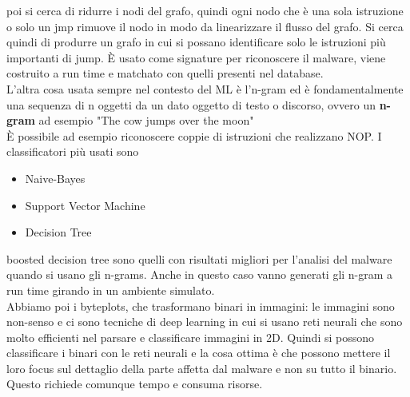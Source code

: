 \documentclass[12pt, oneside]{extbook} %
\begin{document}
poi si cerca di ridurre i nodi del grafo, quindi ogni nodo che è una sola istruzione o solo un jmp rimuove il nodo in modo da linearizzare il flusso del grafo. Si cerca quindi di produrre un grafo in cui si possano identificare solo le istruzioni più importanti di jump. È usato come signature per riconoscere il malware, viene costruito a run time e matchato con quelli presenti nel database.\\L'altra cosa usata sempre nel contesto del ML è l'n-gram ed è fondamentalmente una sequenza di n oggetti da un dato oggetto di testo o discorso, ovvero un \textbf{n-gram} ad esempio "The cow jumps over the moon"\\È possibile ad esempio  riconoscere coppie di istruzioni che realizzano NOP. I classificatori più usati sono
\begin{itemize}
	\item Naive-Bayes
	\item Support Vector Machine
	\item Decision Tree
\end{itemize}
boosted decision tree sono quelli con risultati migliori per l'analisi del malware quando si usano gli n-grams. Anche in questo caso vanno generati gli n-gram a run time girando in un ambiente simulato.\\Abbiamo poi i byteplots, che trasformano binari in immagini: le immagini sono non-senso e ci sono tecniche di deep learning in cui si usano reti neurali che sono molto efficienti nel parsare e classificare immagini in 2D. Quindi si possono classificare i binari con le reti neurali e la cosa ottima è che possono mettere il loro focus sul dettaglio della parte affetta dal malware e non su tutto il binario. Questo richiede comunque tempo e consuma risorse.
\end{document}
